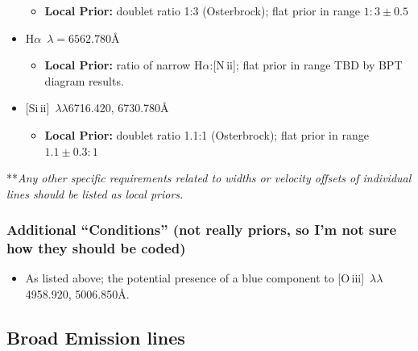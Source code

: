 \documentclass[12pt,letterpaper]{article}
\newcommand{\Halpha}{\ifmmode {\rm H}\alpha \else H$\alpha$\fi}
\newcommand{\nii}{N\,{\sc ii}}
\newcommand{\oiii}{O\,{\sc iii}}
\newcommand{\Sizw}{Si\,{\sc ii}}
\begin{document}
\begin{itemize}
\begin{itemize}
          \item {\bf Local Prior:} doublet ratio 1:3 (Osterbrock); flat prior in range $1:3\pm 0.5$
        \end{itemize}
      \item \Halpha\ $\lambda=6562.780$\AA
        \begin{itemize}
          \item {\bf Local Prior:} ratio of narrow \Halpha:[\nii]; flat prior in range TBD by BPT diagram results.
        \end{itemize}
      \item {[\Sizw]\, $\lambda \lambda$6716.420, 6730.780\AA}
        \begin{itemize}
          \item {\bf Local Prior:} doublet ratio 1.1:1 (Osterbrock); flat prior in range $1.1\pm 0.3:1$
        \end{itemize}
    \end{itemize}

**{\it Any other specific requirements related to widths or velocity offsets of individual lines should be listed as local priors.}

\subsubsection*{Additional ``Conditions'' (not really priors, so I'm not sure how they should be coded)}
\begin{itemize}
   \item As listed above; the potential presence of a blue component to
    [\oiii]\, $\lambda \lambda$4958.920, 5006.850\AA.
\end{itemize} 
\subsection*{Broad Emission lines}
\end{document}

